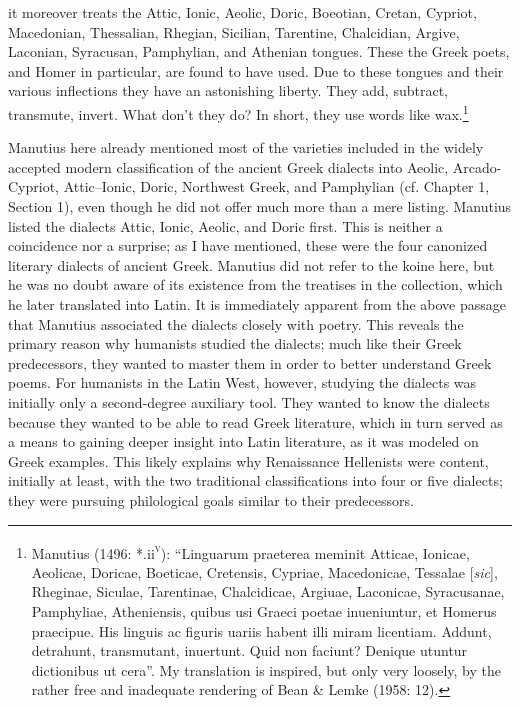 \begin{styleQuote}
it moreover treats the Attic, Ionic, Aeolic, Doric, Boeotian, Cretan, Cypriot, Macedonian, Thessalian, Rhegian, Sicilian, Tarentine, Chalcidian, Argive, Laconian, Syracusan, Pamphylian, and Athenian tongues. These the Greek poets, and Homer in particular, are found to have used. Due to these tongues and their various inflections they have an astonishing liberty. They add, subtract, transmute, invert. What don’t they do? In short, they use words like wax.\footnote{ Manutius (1496: *.ii\textsc{\textsuperscript{v}}): “Linguarum praeterea meminit Atticae, Ionicae, Aeolicae, Doricae, Boeticae, Cretensis, Cypriae, Macedonicae, Tessalae [\textit{sic}], Rheginae, Siculae, Tarentinae, Chalcidicae, Argiuae, Laconicae, Syracusanae, Pamphyliae, Atheniensis, quibus usi Graeci poetae inueniuntur, et Homerus praecipue. His linguis ac figuris uariis habent illi miram licentiam. Addunt, detrahunt, transmutant, inuertunt. Quid non faciunt? Denique utuntur dictionibus ut cera”. My translation is inspired, but only very loosely, by the rather free and inadequate rendering of Bean \& Lemke (1958: 12).}
\end{styleQuote}

\begin{styleStandard}
Manutius here already mentioned most of the varieties included in the widely accepted modern classification of the ancient Greek dialects into Aeolic, Arcado-Cypriot, Attic–Ionic, Doric, Northwest Greek, and Pamphylian (cf. Chapter 1, Section 1), even though he did not offer much more than a mere listing. Manutius listed the dialects Attic, Ionic, Aeolic, and Doric first. This is neither a coincidence nor a surprise; as I have mentioned, these were the four canonized literary dialects of ancient Greek. Manutius did not refer to the koine here, but he was no doubt aware of its existence from the treatises in the collection, which he later translated into Latin. It is immediately apparent from the above passage that Manutius associated the dialects closely with poetry. This reveals the primary reason why humanists studied the dialects; much like their Greek predecessors, they wanted to master them in order to better understand Greek poems. For humanists in the Latin West, however, studying the dialects was initially only a second-degree auxiliary tool. They wanted to know the dialects because they wanted to be able to read Greek literature, which in turn served as a means to gaining deeper insight into Latin literature, as it was modeled on Greek examples. This likely explains why Renaissance Hellenists were content, initially at least, with the two traditional classifications into four or five dialects; they were pursuing philological goals similar to their predecessors.
\end{styleStandard}

